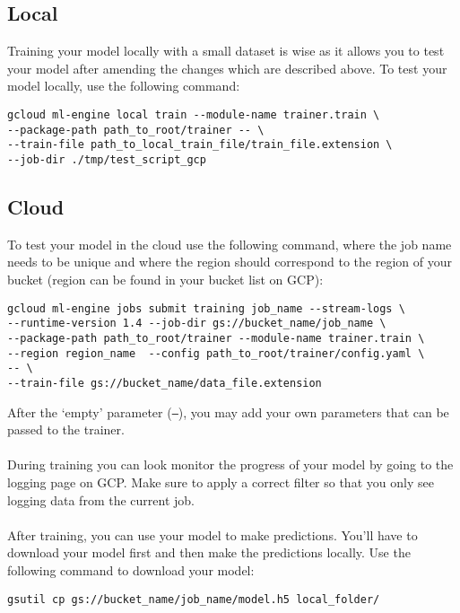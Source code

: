 \documentclass{article}
\begin{document}
\subsection{Local}
Training your model locally with a small dataset is wise as it allows you to test your model after amending the changes which are described above. To test your model locally, use the following command:

\begin{verbatim}
gcloud ml-engine local train --module-name trainer.train \ 
--package-path path_to_root/trainer -- \
--train-file path_to_local_train_file/train_file.extension \
--job-dir ./tmp/test_script_gcp
\end{verbatim}


\subsection{Cloud}
To test your model in the cloud use the following command, where the job name needs to be unique and where the region should correspond to the region of your bucket (region can be found in your bucket list on GCP):
\begin{verbatim}
gcloud ml-engine jobs submit training job_name --stream-logs \
--runtime-version 1.4 --job-dir gs://bucket_name/job_name \
--package-path path_to_root/trainer --module-name trainer.train \
--region region_name  --config path_to_root/trainer/config.yaml \
-- \
--train-file gs://bucket_name/data_file.extension
\end{verbatim}
After the `empty' parameter (\texttt{--}), you may add your own parameters that can be passed to the trainer. \\
\\
During training you can look monitor the progress of your model by going to the logging page on GCP. Make sure to apply a correct filter so that you only see logging data from the current job.
\\
\\
After training, you can use your model to make predictions. You'll have to download your model first and then make the predictions locally. Use the following command to download your model:
\begin{verbatim}
gsutil cp gs://bucket_name/job_name/model.h5 local_folder/
\end{verbatim}
\end{document}
